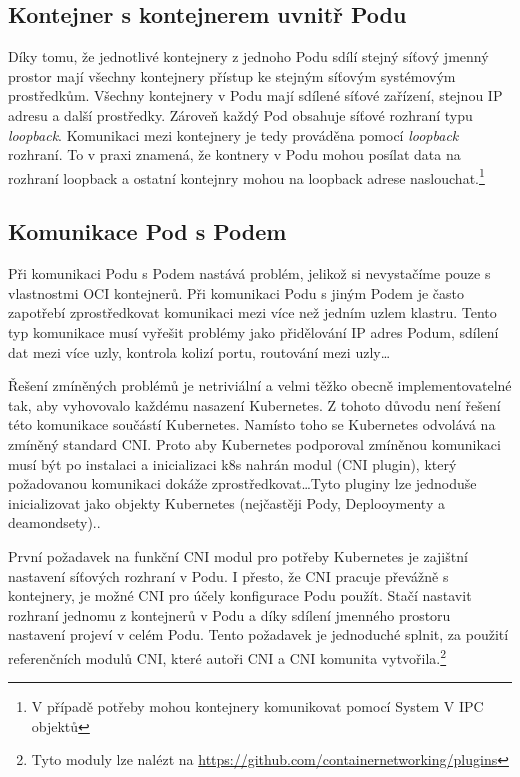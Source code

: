 \subsection{Kontejner s kontejnerem uvnitř Podu}
Díky tomu, že jednotlivé kontejnery z jednoho Podu sdílí stejný síťový jmenný prostor mají všechny kontejnery přístup ke stejným síťovým systémovým prostředkům. Všechny kontejnery v Podu mají sdílené síťové zařízení, stejnou IP adresu a další prostředky. Zároveň každý Pod obsahuje síťové rozhraní typu \textit{loopback}. Komunikaci mezi kontejnery je tedy prováděna pomocí \textit{loopback} rozhraní. To v praxi znamená, že kontnery v Podu mohou posílat data na rozhraní loopback a ostatní kontejnry mohou na loopback adrese naslouchat.\footnote{V případě potřeby mohou kontejnery komunikovat pomocí System V IPC objektů}

\subsection{Komunikace Pod s Podem}
Při komunikaci Podu s Podem nastává problém, jelikož si nevystačíme pouze s vlastnostmi OCI kontejnerů. Při komunikaci Podu s jiným Podem je často zapotřebí zprostředkovat komunikaci mezi více než jedním uzlem klastru.
Tento typ komunikace musí vyřešit problémy jako přidělování IP adres Podum, sdílení dat mezi více uzly, kontrola kolizí portu, routování mezi uzly\ldots

Řešení zmíněných problémů je netriviální a velmi těžko obecně implementovatelné tak, aby vyhovovalo každému nasazení Kubernetes. Z tohoto důvodu není řešení této komunikace součástí Kubernetes. Namísto toho se Kubernetes odvolává na zmíněný standard CNI. Proto aby Kubernetes podporoval zmíněnou komunikaci musí být po instalaci a inicializaci k8s nahrán modul (CNI plugin), který požadovanou komunikaci dokáže zprostředkovat\ldots{Tyto pluginy lze jednoduše inicializovat jako objekty Kubernetes (nejčastěji Pody, Deplooymenty a deamondsety).}.

První požadavek na funkční CNI modul pro potřeby Kubernetes je zajištní nastavení síťových rozhraní v Podu. I přesto, že CNI pracuje převážně s kontejnery, je možné CNI pro účely konfigurace Podu použít. Stačí nastavit rozhraní jednomu z kontejnerů v Podu a díky sdílení jmenného prostoru nastavení projeví v celém Podu. Tento požadavek je jednoduché splnit, za použití referenčních modulů CNI, které autoři CNI a CNI komunita vytvořila.\footnote{Tyto moduly lze nalézt na \href{https://github.com/containernetworking/plugins}{https://github.com/containernetworking/plugins}}

